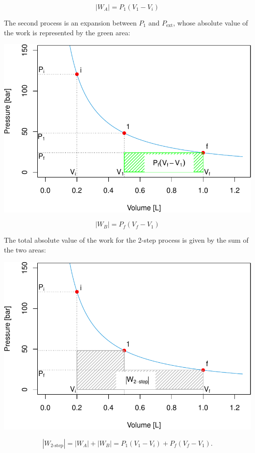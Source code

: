 \documentclass[
  9pt,
]{extbook}
\theoremstyle{definition}
\theoremstyle{definition}
\theoremstyle{definition}
\theoremstyle{remark}
\begin{document}
\begin{equation}
\left| W_A \right| = P_1 (V_1-V_i)
  \label{eq:Warea2}
\end{equation}

The second process is an expansion between \(P_1\) and \(P_{\text{ext}}\), whose absolute value of the work is represented by the green area:

\begin{center}\includegraphics[width=0.7\linewidth]{pchem1_files/figure-latex/unnamed-chunk-5-1} \end{center}

\begin{equation}
\left| W_B \right| = P_f (V_f-V_1)
  \label{eq:Warea3}
\end{equation}

The total absolute value of the work for the 2-step process is given by the sum of the two areas:

\begin{center}\includegraphics[width=0.7\linewidth]{pchem1_files/figure-latex/unnamed-chunk-6-1} \end{center}

\begin{equation}
  \left| W_{\text{2-step}} \right| = \left| W_A \right| + \left| W_B \right| = P_1 (V_1-V_i)+P_f (V_f-V_1).
  \label{eq:Warea4}
\end{equation}
\end{document}
